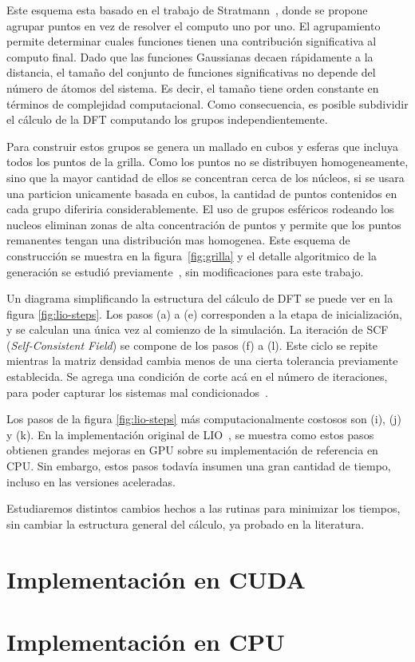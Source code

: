 Este esquema esta basado en el trabajo de Stratmann~\cite{Stratmann}, donde se propone
agrupar puntos en vez de resolver el computo uno por uno. El agrupamiento permite determinar
cuales funciones tienen una contribuci\'on significativa al computo final. Dado que las
funciones Gaussianas decaen r\'apidamente a la distancia, el tama\~no del conjunto de
funciones significativas no depende del n\'umero de \'atomos del sistema. Es decir, el tama\~no
tiene orden constante en t\'erminos de complejidad computacional. Como consecuencia, es posible
subdividir el c\'alculo de la DFT computando los grupos independientemente.

Para construir estos grupos se genera un mallado en cubos y esferas que incluya todos los puntos
de la grilla. Como los puntos no se distribuyen homogeneamente, sino que la mayor cantidad de ellos
se concentran cerca de los núcleos, si se usara una particion unicamente basada en cubos, la cantidad
de puntos contenidos en cada grupo diferiria considerablemente. El uso de grupos esféricos rodeando
los nucleos eliminan zonas de alta concentraci\'on de puntos y permite que los puntos remanentes
tengan una distribuci\'on mas homogenea. Este esquema de construcci\'on se muestra en la figura~\ref{fig:grilla}
y el detalle algoritmico de la generaci\'on se estudi\'o previamente~\cite{Nitsche2014,TesisNitsche},
sin modificaciones para este trabajo.

Un diagrama simplificando la estructura del c\'alculo de DFT se puede ver en la figura \ref{fig:lio-steps}.
Los pasos (a) a (e) corresponden a la etapa de inicializaci\'on, y se calculan una \'unica vez
al comienzo de la simulaci\'on. La iteraci\'on de SCF (\textit{Self-Consistent Field}) se
compone de los pasos (f) a (l). Este ciclo se repite mientras la matriz densidad cambia
menos de una cierta tolerancia previamente establecida. Se agrega una condici\'on de corte ac\'a
en el n\'umero de iteraciones, para poder capturar los sistemas mal condicionados~\cite{Nitsche2014}.

Los pasos de la figura \ref{fig:lio-steps} m\'as computacionalmente costosos son (i), (j) y (k).
En la implementaci\'on original de LIO~\cite{TesisNitsche}, se muestra como estos pasos
obtienen grandes mejoras en GPU sobre su implementaci\'on de referencia en CPU. Sin embargo,
estos pasos todav\'ia insumen una gran cantidad de tiempo, incluso en las versiones aceleradas.

Estudiaremos distintos cambios hechos a las rutinas para minimizar los tiempos,
sin cambiar la estructura general del c\'alculo, ya probado en la literatura.

\section{Implementaci\'on en CUDA}



\section{Implementaci\'on en CPU}


